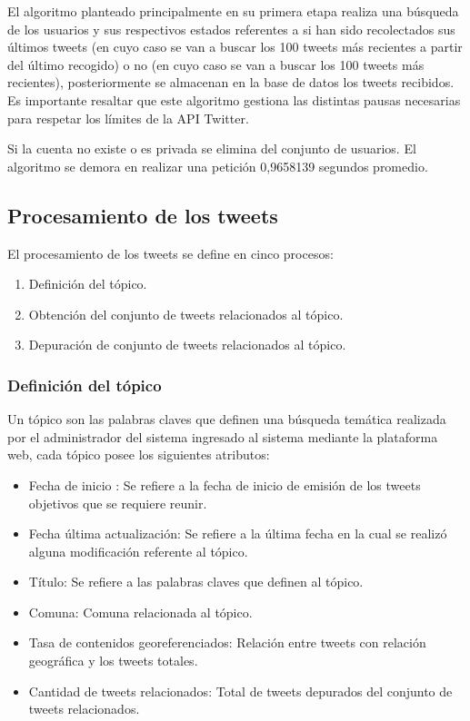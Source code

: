El algoritmo planteado principalmente en su primera etapa realiza una búsqueda de los usuarios y sus respectivos estados referentes a si han sido recolectados sus últimos tweets (en cuyo caso se van a buscar los 100 tweets más recientes a partir del último recogido) o no (en cuyo caso se van a buscar los 100 tweets más recientes), posteriormente se almacenan en la base de datos los tweets recibidos. Es importante resaltar que este algoritmo gestiona las distintas pausas necesarias para respetar los límites de la API Twitter.

Si la cuenta no existe o es privada se elimina del conjunto de usuarios. El algoritmo se demora en realizar una petición 0,9658139 segundos promedio. 

\subsection{Procesamiento de los tweets}

El procesamiento de los tweets se define en cinco procesos:
\begin{enumerate}
	\item{Definición del tópico.}
	\item{Obtención del conjunto de tweets relacionados al tópico.}
	\item{Depuración de conjunto de tweets relacionados al tópico.}
\end{enumerate}

\subsubsection{Definición del tópico}

Un tópico son las palabras claves que definen una búsqueda temática realizada por el administrador del sistema ingresado al sistema mediante la plataforma web, cada tópico posee los siguientes atributos:
\begin{itemize}
	\item Fecha de inicio : Se refiere a la fecha de inicio de emisión de los tweets objetivos que se requiere reunir.
	\item Fecha última actualización: Se refiere a la última fecha en la cual se realizó alguna modificación referente al tópico.
	\item Título: Se refiere a las palabras claves que definen al tópico. 
	\item Comuna: Comuna relacionada al tópico.
	\item Tasa de contenidos georeferenciados: Relación entre tweets con relación geográfica y los tweets totales.
	\item Cantidad de tweets relacionados: Total de tweets depurados del conjunto de tweets relacionados. 
\end{itemize}

